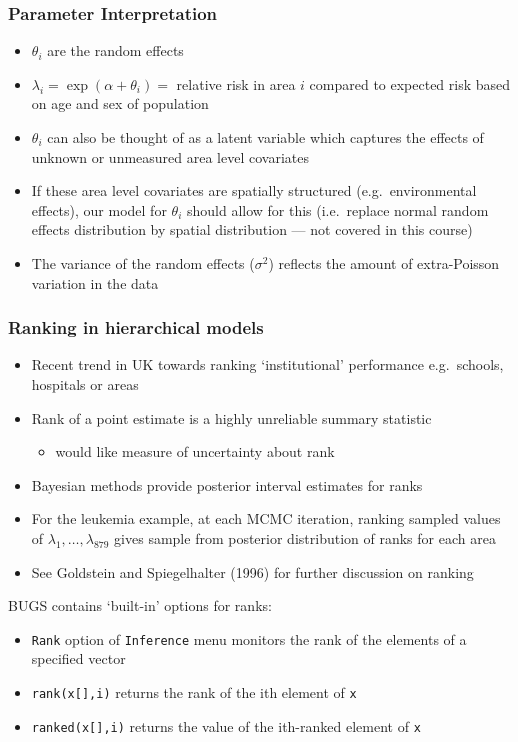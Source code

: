 \documentclass{beamer}
\newcommand{\bi}{\begin{itemize}}
\newcommand{\ei}{\end{itemize}}
\newcommand{\I}{\item}
\newcommand{\bibig}{\begin{itemize}}
\newcommand{\eibig}{\end{itemize}}
\begin{document}
\begin{frame}
\frametitle{Parameter Interpretation}
\bibig
\I $\theta_i$ are the \alert{random effects}\vspace{2mm}
\I $\lambda_i = \exp(\alpha + \theta_i) =$ relative risk in area
   $i$ compared to expected risk based on age and sex of population\vspace{2mm}
\I $\theta_i$ can also be thought of as a latent variable which
   captures the effects of unknown or unmeasured area level
   covariates\vspace{2mm}
\I If these area level covariates are spatially structured
   (e.g.~environmental effects), our model for $\theta_i$
   should allow for this (i.e.~replace normal random effects
   distribution by spatial distribution --- not covered in this course)\vspace{2mm}
\I The variance of the random effects ($\sigma^2$) reflects
   the amount of extra-Poisson variation in the data
\eibig
\end{frame}

\begin{frame}
\frametitle{Ranking in hierarchical models}
\bi
\I Recent trend in UK towards ranking \lq institutional' performance e.g.~schools,
   hospitals or areas\vspace{1mm}
\I Rank of a point estimate is a highly unreliable summary statistic\vspace{0.5mm}
  \bi
  \I would like measure of uncertainty about rank\vspace{1mm}
  \ei
\I Bayesian methods provide posterior interval estimates for ranks\vspace{1mm}
\I For the leukemia example, at each MCMC iteration, ranking sampled values of
$\lambda_1,\ldots,\lambda_{879}$  gives sample from posterior distribution of ranks for each area\vspace{1mm}
\I See Goldstein and Spiegelhalter (1996) for further discussion on ranking\vspace{1mm}
\ei
BUGS contains \lq built-in' options for ranks:\vspace{0.5mm}
\bi
\I {\tt Rank} option of {\tt Inference} menu monitors the rank of the elements of a specified
vector\vspace{0.5mm}
\I {\tt rank(x[],i)} returns the rank of the ith element of {\tt x}\vspace{0.5mm}
\I {\tt ranked(x[],i)} returns the value of the ith-ranked element of {\tt x}
\ei
\end{frame}
\end{document}
